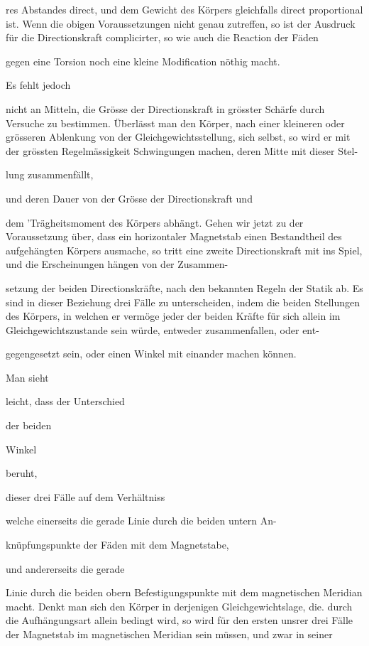 \documentclass[12pt,a4paper]{article}
\begin{document}
res Abstandes direct, und dem Gewicht des Körpers gleichfalls direct proportional ist. Wenn die obigen Voraussetzungen nicht genau zutreffen, so ist der Ausdruck für die Directionskraft complicirter, so wie auch die Reaction der Fäden

gegen eine Torsion noch eine kleine Modification nöthig macht.

Es fehlt jedoch

nicht an Mitteln, die Grösse der Directionskraft in grösster Schärfe durch Versuche zu bestimmen. Überlässt man den Körper, nach einer kleineren oder grösseren Ablenkung von der Gleichgewichtsstellung, sich selbst, so wird er mit der grössten Regelmässigkeit Schwingungen machen, deren Mitte mit dieser Stel-

lung zusammenfällt,

und deren Dauer von der Grösse der Directionskraft und

dem 'Trägheitsmoment des Körpers abhängt. Gehen wir jetzt zu der Voraussetzung über, dass ein horizontaler Magnetstab einen Bestandtheil des aufgehängten Körpers ausmache, so tritt eine zweite Directionskraft mit ins Spiel, und die Erscheinungen hängen von der Zusammen-

setzung der beiden Directionskräfte, nach den bekannten Regeln der Statik ab. Es sind in dieser Beziehung drei Fälle zu unterscheiden, indem die beiden Stellungen des Körpers, in welchen er vermöge jeder der beiden Kräfte für sich allein im Gleichgewichtszustande sein würde, entweder zusammenfallen, oder ent-

gegengesetzt sein, oder einen Winkel mit einander machen können.

Man sieht

leicht, dass der Unterschied

der beiden

Winkel

beruht,

dieser drei Fälle auf dem Verhältniss

welche einerseits die gerade Linie durch die beiden untern An-

knüpfungspunkte der Fäden mit dem Magnetstabe,

und andererseits die gerade

Linie durch die beiden obern Befestigungspunkte mit dem magnetischen Meridian macht. Denkt man sich den Körper in derjenigen Gleichgewichtslage, die. durch die Aufhängungsart allein bedingt wird, so wird für den ersten unsrer drei Fälle der Magnetstab im magnetischen Meridian sein müssen, und zwar in seiner
\end{document}
